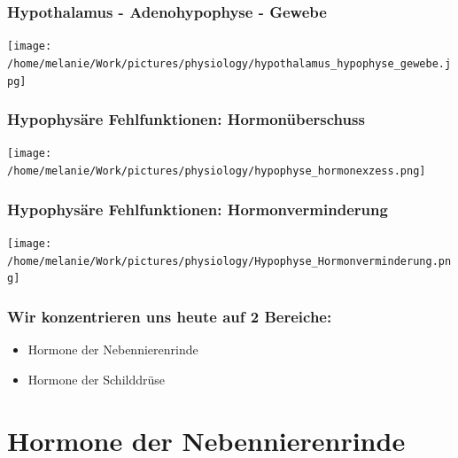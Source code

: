 \documentclass{beamer}
\begin{document}
\begin{frame}
\frametitle{Hypothalamus - Adenohypophyse - Gewebe}
\begin{center}
  \texttt{[image: /home/melanie/Work/pictures/physiology/hypothalamus\_hypophyse\_gewebe.jpg]}
\end{center}
\end{frame}




\begin{frame}
\frametitle{Hypophysäre Fehlfunktionen: Hormonüberschuss}

\begin{center}
\texttt{[image: /home/melanie/Work/pictures/physiology/hypophyse\_hormonexzess.png]}
\end{center}

\end{frame}


\begin{frame}
\frametitle{Hypophysäre Fehlfunktionen: Hormonverminderung}

\begin{center}
\texttt{[image: /home/melanie/Work/pictures/physiology/Hypophyse\_Hormonverminderung.png]}
\end{center}

\end{frame}


\begin{frame}
\frametitle{Wir konzentrieren uns heute auf 2 Bereiche:}

\begin{itemize}
\item
Hormone der Nebennierenrinde
\item
Hormone der Schilddrüse
\end{itemize}

\end{frame}

\section{Hormone der Nebennierenrinde}



\end{document}
